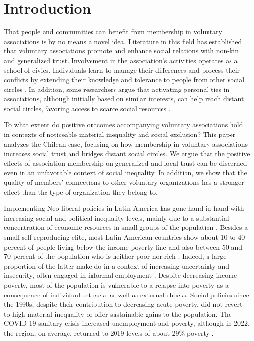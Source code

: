 \newpage


\maketitle

\section{Introduction}

That people and communities can benefit from membership in voluntary associations is by no means a novel idea. Literature in this field has established that voluntary associations promote and enhance social relations with non-kin and generalized trust. Involvement in the association’s activities operates as a school of civics. Individuals learn to manage their differences and process their conflicts by extending their knowledge and tolerance to people from other social circles \parencite{cote_untangling_2009}. In addition, some researchers argue that activating personal ties in associations, although initially based on similar interests, can help reach distant social circles, favoring access to scarce social resources \parencite{diani_social_1997, tindall_network_2012, benton_uniters_2016, baggetta_representative_2016, bekkers_social_2008}. 
\bigskip

To what extent do positive outcomes accompanying voluntary associations hold in contexts of noticeable material inequality and social exclusion? This paper analyzes the Chilean case, focusing on how membership in voluntary associations increases social trust and bridges distant social circles. We argue that the positive effects of association membership on generalized and local trust can be discerned even in an unfavorable context of social inequality. In addition, we show that the quality of members' connections to other voluntary organizations has a stronger effect than the type of organization they belong to.
\bigskip

Implementing Neo-liberal policies in Latin America has gone hand in hand with increasing social and political inequality levels, mainly due to a substantial concentration of economic resources in small groups of the population \parencite{sassen_expulsiones_2015}. Besides a small self-reproducing elite, most Latin-American countries show about 10 to 40 percent of people living below the income poverty line and also between 50 and 70 percent of the population who is neither poor nor rich \parencite{lopez-calva_macroeconomiy_2004}. Indeed, a large proportion of the latter make do in a context of increasing uncertainty and insecurity, often engaged in informal employment \parencite{lomnitz_lo_2008, portes_free-market_2005, schneider_economic_2008}. Despite decreasing income poverty, most of the population is vulnerable to a relapse into poverty as a consequence of individual setbacks as well as external shocks. Social policies since the 1990s, despite their contribution to decreasing acute poverty, did not revert to high material inequality or offer sustainable gains to the population. The COVID-19 sanitary crisis increased unemployment and poverty, although in 2022, the region, on average, returned to 2019 levels of about 29\% poverty \parencite{cepal_panorama_2023}.
\bigskip

